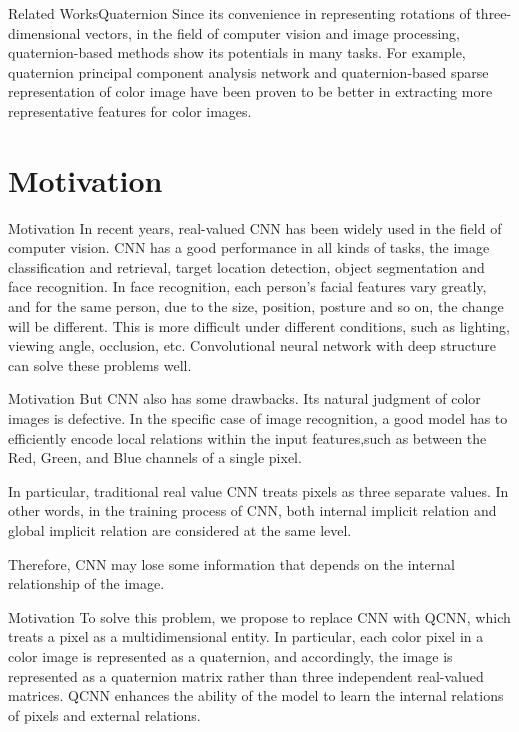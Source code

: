 \documentclass{beamer}
\begin{document}
\begin{frame}{Related Works}{Quaternion}
Since its convenience in representing rotations of three-dimensional vectors, in the field of computer vision and image processing, quaternion-based methods show its potentials in many tasks. For example, quaternion principal component analysis network\cite{ZENG2016416} and quaternion-based sparse representation of color image\cite{6607436} have been proven to be better in extracting more representative features for color images.
\end{frame}





\section{Motivation}
\begin{frame}{Motivation}
In recent years, real-valued CNN has been widely used in the field of computer vision. CNN has a good performance in all kinds of tasks, the image classification and retrieval, target location detection, object segmentation and face recognition. In face recognition, each person's facial features vary greatly, and for the same person, due to the size, position, posture and so on, the change will be different. This is more difficult under different conditions, such as lighting, viewing angle, occlusion, etc\cite{9065279}. Convolutional neural network with deep structure can solve these problems well.
\end{frame}
\begin{frame}{Motivation}
But CNN also has some drawbacks. Its natural judgment of color images is defective\cite{parcollet:hal-02107644}.
In the specific case of image recognition, a good model has to efficiently encode local relations within the input features,such as between the Red, Green, and Blue channels of a single pixel.


In particular, traditional real value CNN treats pixels as three separate values. In other words, in the training process of CNN, both internal implicit relation and global implicit relation are considered at the same level.

Therefore, CNN may lose some information that depends on the internal relationship of the image.
\end{frame}
\begin{frame}{Motivation}
To solve this problem, we propose to replace CNN with QCNN, which treats a pixel as a multidimensional entity.
In particular, each color pixel in a color image is represented as a quaternion, and accordingly, the image is represented as a quaternion matrix rather than three independent real-valued matrices.
QCNN enhances the ability of the model to learn the internal relations of pixels and external relations.
\end{frame}
\end{document}
